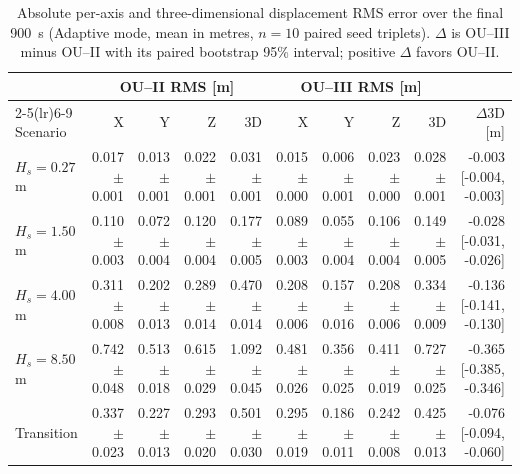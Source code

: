 \begin{table}[t]
  \centering
  \caption{Absolute per-axis and three-dimensional displacement RMS error over the final \SI{900}{s} (Adaptive mode, mean in metres, $n=10$ paired seed triplets). $\Delta$ is OU--III minus OU--II with its paired bootstrap 95\% interval; positive $\Delta$ favors OU--II.}
  \label{tab:ou_mc_axes}
  \footnotesize
  \setlength{\tabcolsep}{3.0pt}
  \begin{tabular}{@{}lrrrrrrrrr@{}}
    \toprule
    & \multicolumn{4}{c}{OU--II RMS [m]} & \multicolumn{4}{c}{OU--III RMS [m]} & \\
    \cmidrule(lr){2-5}\cmidrule(lr){6-9}
    Scenario & X & Y & Z & 3D & X & Y & Z & 3D & $\Delta$3D [m] \\
    \midrule
    $H_s=0.27$ m & 0.017 $\pm$ 0.001 & 0.013 $\pm$ 0.001 & 0.022 $\pm$ 0.001 & 0.031 $\pm$ 0.001 & 0.015 $\pm$ 0.000 & 0.006 $\pm$ 0.001 & 0.023 $\pm$ 0.000 & 0.028 $\pm$ 0.001 & -0.003 [-0.004, -0.003] \\
    $H_s=1.50$ m & 0.110 $\pm$ 0.003 & 0.072 $\pm$ 0.004 & 0.120 $\pm$ 0.004 & 0.177 $\pm$ 0.005 & 0.089 $\pm$ 0.003 & 0.055 $\pm$ 0.004 & 0.106 $\pm$ 0.004 & 0.149 $\pm$ 0.005 & -0.028 [-0.031, -0.026] \\
    $H_s=4.00$ m & 0.311 $\pm$ 0.008 & 0.202 $\pm$ 0.013 & 0.289 $\pm$ 0.014 & 0.470 $\pm$ 0.014 & 0.208 $\pm$ 0.006 & 0.157 $\pm$ 0.016 & 0.208 $\pm$ 0.006 & 0.334 $\pm$ 0.009 & -0.136 [-0.141, -0.130] \\
    $H_s=8.50$ m & 0.742 $\pm$ 0.048 & 0.513 $\pm$ 0.018 & 0.615 $\pm$ 0.029 & 1.092 $\pm$ 0.045 & 0.481 $\pm$ 0.026 & 0.356 $\pm$ 0.025 & 0.411 $\pm$ 0.019 & 0.727 $\pm$ 0.025 & -0.365 [-0.385, -0.346] \\
    Transition & 0.337 $\pm$ 0.023 & 0.227 $\pm$ 0.013 & 0.293 $\pm$ 0.020 & 0.501 $\pm$ 0.030 & 0.295 $\pm$ 0.019 & 0.186 $\pm$ 0.011 & 0.242 $\pm$ 0.008 & 0.425 $\pm$ 0.013 & -0.076 [-0.094, -0.060] \\
    \bottomrule
  \end{tabular}
\end{table}


